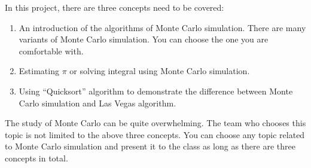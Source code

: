 \documentclass{article}
\begin{document}
In this project, there are three concepts need to be covered:
\begin{enumerate}
    \item An introduction of the algorithms of Monte Carlo simulation. There are many variants of Monte Carlo simulation. You can choose the one you are comfortable with.
    \item Estimating $\pi$ or solving integral using Monte Carlo simulation.
    \item Using ``Quicksort'' algorithm to demonstrate the difference between Monte Carlo simulation and Las Vegas algorithm.
\end{enumerate}

The study of Monte Carlo can be quite overwhelming. The team who chooses this topic is not limited to the above three concepts. You can choose any topic related to Monte Carlo simulation and present it to the class as long as there are three concepts in total.
\end{document}
